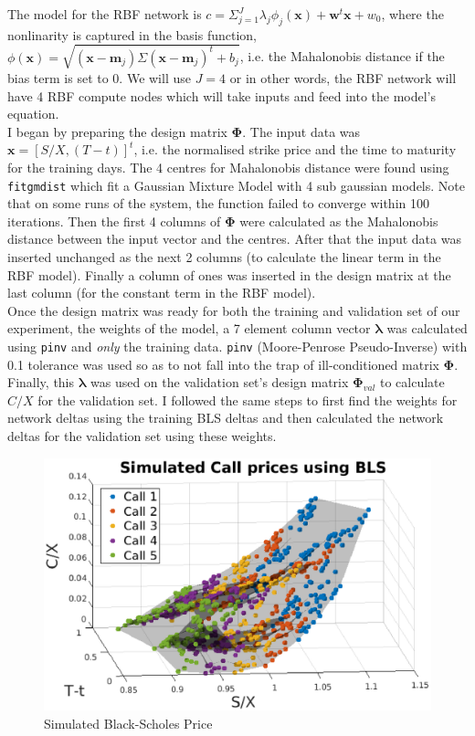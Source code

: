 \documentclass[11pt, fleqn]{article}
\begin{document}
The model for the RBF network is $c = \Sigma_{j=1}^J\lambda_j\phi_j(\bm{x}) + \bm{w}^t\bm{x} + w_0$, where the nonlinarity is captured in the basis function, $\phi(\bm{x}) = \sqrt{(\bm{x} - \bm{m}_j)\Sigma(\bm{x} - \bm{m}_j)^t + b_j}$, i.e. the Mahalonobis distance if the bias term is set to 0. We will use $J = 4$ or in other words, the RBF network will have 4 RBF compute nodes which will take inputs and feed into the model's equation.\\

I began by preparing the design matrix $\bm{\Phi}$. The input data was $\bm{x} = [S/X, (T-t)]^t$, i.e. the normalised strike price and the time to maturity for the training days. The 4 centres for Mahalonobis distance were found using \texttt{fitgmdist} which fit a Gaussian Mixture Model with 4 sub gaussian models. Note that on some runs of the system, the function failed to converge within 100 iterations. Then the first 4 columns of $\bm{\Phi}$ were calculated as the Mahalonobis distance between the input vector and the centres. After that the input data was inserted unchanged as the next 2 columns (to calculate the linear term in the RBF model). Finally a column of ones was inserted in the design matrix at the last column (for the constant term in the RBF model).\\

Once the design matrix was ready for both the training and validation set of our experiment, the weights of the model, a 7 element column vector $\bm{\lambda}$ was calculated using \texttt{pinv} and \textit{only} the training data. \texttt{pinv} (Moore-Penrose Pseudo-Inverse) with 0.1 tolerance was used so as to not fall into the trap of ill-conditioned matrix $\bm{\Phi}$. Finally, this $\bm{\lambda}$ was used on the validation set's design matrix $\bm{\Phi}_{val}$ to calculate $C/X$ for the validation set. I followed the same steps to first find the weights for network deltas using the training BLS deltas and then calculated the network deltas for the validation set using these weights.\\

\begin{figure}[!h]
\begin{center}
	\includegraphics[scale=.6] {q1_simulated_bls.eps}
	\caption{Simulated Black-Scholes Price}
	\label{fig:q1-simulated-bls}
\end{center}
\end{figure}
\end{document}
